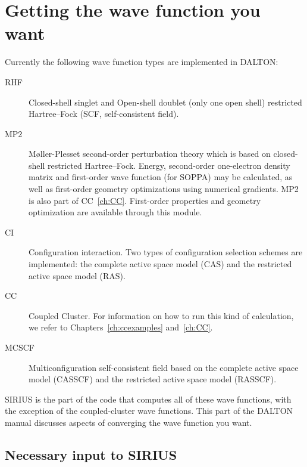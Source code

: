 \chapter{\label{ch:wf-guide}Getting the wave function you want}

Currently the following wave function types are implemented in DALTON:

\begin{description}

\item[RHF] Closed-shell singlet and Open-shell doublet (only one open shell)
restricted Hartree--Fock (SCF, self-consistent
field).

\item[MP2]
M{\o}ller-Plesset second-order perturbation theory which is based on
closed-shell restricted Hartree--Fock.  Energy, second-order one-electron
density matrix and first-order wave function (for SOPPA) may be
calculated, as well as first-order geometry optimizations using
numerical gradients. MP2 is also part of CC~\ref{ch:CC}.
First-order properties and geometry optimization are available through
this module.  

\item[CI] Configuration
interaction. Two types of
configuration selection schemes are implemented: the complete active
space model (CAS) and the restricted active space model (RAS).

\item[CC] Coupled Cluster.
For information on how to run this kind of calculation, we refer to 
Chapters~\ref{ch:ccexamples} and~\ref{ch:CC}.

\item[MCSCF] Multiconfiguration self-consistent field based on
the complete active space model (CASSCF) and
the restricted active space model
(RASSCF).

\end{description}

SIRIUS is the part of the code that computes all of these
wave functions, with the exception of the coupled-cluster wave functions.
This part of the DALTON manual discusses aspects of converging the
wave function you want.

\section{\label{sec:ig_necinp} Necessary input to SIRIUS}

